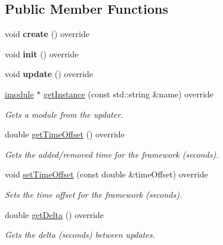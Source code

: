 \subsection*{Public Member Functions}
\begin{DoxyCompactItemize}
\item 
\mbox{\label{classflounder_1_1glfwupdater_acd58077965d5ba137961c567d7d79aa9}} 
void {\bfseries create} () override
\item 
\mbox{\label{classflounder_1_1glfwupdater_ab0c8addaf2393f4c88969e71ed78f600}} 
void {\bfseries init} () override
\item 
\mbox{\label{classflounder_1_1glfwupdater_a2443d270f702e67ab44c7afb88c71a5e}} 
void {\bfseries update} () override
\item 
\hyperlink{classflounder_1_1imodule}{imodule} $\ast$ \hyperlink{classflounder_1_1glfwupdater_a284945635b93ffc1bd6164ff20565349}{get\+Instance} (const std\+::string \&name) override
\begin{DoxyCompactList}\small\item\em Gets a module from the updater. \end{DoxyCompactList}\item 
double \hyperlink{classflounder_1_1glfwupdater_a6393f60d2b0f84a78ccf14b0c55ae1ee}{get\+Time\+Offset} () override
\begin{DoxyCompactList}\small\item\em Gets the added/removed time for the framework (seconds). \end{DoxyCompactList}\item 
void \hyperlink{classflounder_1_1glfwupdater_a7dc4371863e39a3a7870e4a2ac539fed}{set\+Time\+Offset} (const double \&time\+Offset) override
\begin{DoxyCompactList}\small\item\em Sets the time offset for the framework (seconds). \end{DoxyCompactList}\item 
double \hyperlink{classflounder_1_1glfwupdater_a8da4916f3335126413a072203b94a735}{get\+Delta} () override
\begin{DoxyCompactList}\small\item\em Gets the delta (seconds) between updates. \end{DoxyCompactList}\item 

\end{DoxyCompactItemize}
